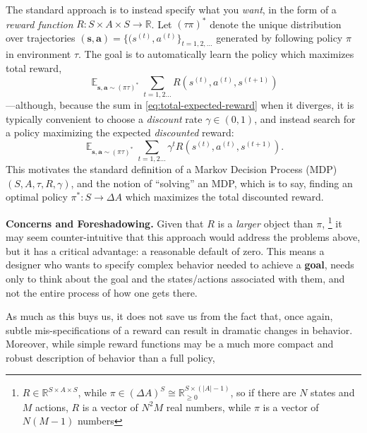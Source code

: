 \documentclass{article}
\DeclareMathOperator*{\Ex}{\mathbb E}
\begin{document}
    The standard approach is to instead specify what you \emph{want}, in the form of a \emph{reward function} $R : S \times A \times S \to \mathbb R$. Let $(\tau\pi)^*$ denote the unique distribution over trajectories $(\mathbf s, \mathbf a) = \{(s^{(t)}, a^{(t)}\}_{t =1,2,\ldots}$ generated by following policy $\pi$ in environment $\tau$. The goal is to automatically learn the policy which maximizes total reward, 
    \begin{equation}\label{eq:total-expected-reward}
        \Ex_{\mathbf {s,a} \sim (\pi\tau)^*} \sum_{t=1,2\ldots} R(s^{(t)}, a^{(t)}, s^{(t+1)})
    \end{equation}
    ---although, because the sum in \eqref{eq:total-expected-reward} when it diverges, it is typically convenient to choose a \emph{discount} rate $\gamma \in (0,1)$, and instead search for a policy maximizing the expected \emph{discounted} reward:
    \begin{equation}\label{eq:expected-discounted-reward}
        \Ex_{\mathbf {s,a} \sim (\pi\tau)^*} \sum_{t=1,2\ldots} \gamma^t R(s^{(t)}, a^{(t)}, s^{(t+1)}) 
        .
    \end{equation}
    This motivates the standard definition of a Markov Decision Process (MDP) $(S, A, \tau, R, \gamma)$, and the notion of ``solving'' an MDP, which is to say, finding an optimal policy $\pi^* : S \to \Delta A$ which maximizes the total discounted reward.    
    
    
    \textbf{Concerns and Foreshadowing.}    
    Given that $R$ is a \emph{larger} object than $\pi$,%
        \footnote{$R \in \mathbb R^{S \times A \times S}$, while $\pi \in (\Delta A)^S \cong \mathbb R_{\ge 0}^{S \times (|A|-1)}$, so if there are $N$ states and $M$ actions, $R$ is a vector of $N^2 M$ real numbers, while $\pi$ is a vector of $N(M-1)$ numbers}
    it may seem counter-intuitive that this approach would address the problems above, but it has a critical advantage: a reasonable default of zero.
    This means a designer who wants to specify complex behavior needed to achieve a \textbf{goal}, needs only to think about the goal and the states/actions associated with them, and not the entire process of how one gets there. 
    
    As much as this buys us, it does not save us from the fact that, once again, subtle mis-specifications of a reward can result in dramatic changes in behavior. 
    Moreover, while simple reward functions may be a much more compact and robust description of behavior than a full policy, 
    
\end{document}
